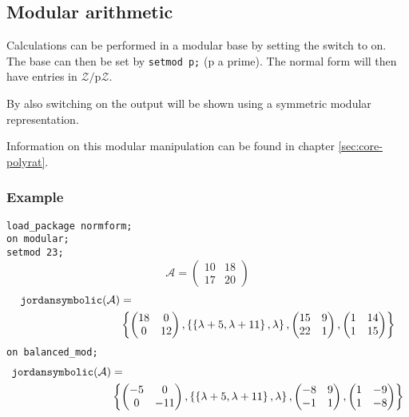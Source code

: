 

\subsection{Modular arithmetic}
\label{sec:normform-modular}

Calculations can be performed in a modular base by setting the switch 
to on. The base can then be set by \texttt{setmod p;} (p a prime). The
normal form will then have entries in $\mathcal{Z}/$p$\mathcal{Z}$.

By also switching on  the output will be shown using
a symmetric modular representation.

Information on this modular manipulation can be found in chapter \ref{sec:core-polyrat}.

\subsubsection{Example}

\texttt{load\_package normform;} \\
\texttt{on modular;} \\
\texttt{setmod 23;}
\[
\mathcal{A} = \begin{pmatrix} 10 & 18 \\ 17 & 20 \end{pmatrix}
\]
\[
\begin{split}
\texttt{jordansymbolic}(\mathcal{A}) & = \\
&\left\{
 \begin{pmatrix} 18 & 0 \\ 0 & 12 \end{pmatrix},
 \left\{ \left\{ \lambda + 5, \lambda + 11  \right\}, \lambda \right\},
         \begin{pmatrix} 15 & 9 \\ 22 & 1 \end{pmatrix},
         \begin{pmatrix} 1 & 14 \\ 1 & 15 \end{pmatrix} \right\}
\end{split}
\]
\texttt{on balanced\_mod;}
\[
\begin{split}
\texttt{jordansymbolic}(\mathcal{A}) & = \\
&\left\{
  \begin{pmatrix} -5 & 0 \\ 0 & -11 \end{pmatrix},
  \left\{ \left\{ \lambda + 5, \lambda + 11  \right\}, \lambda \right\},
  \begin{pmatrix} -8 & 9 \\ -1 & 1 \end{pmatrix},
  \begin{pmatrix} 1 & -9 \\ 1 & -8 \end{pmatrix} \right\}
\end{split}
\]

